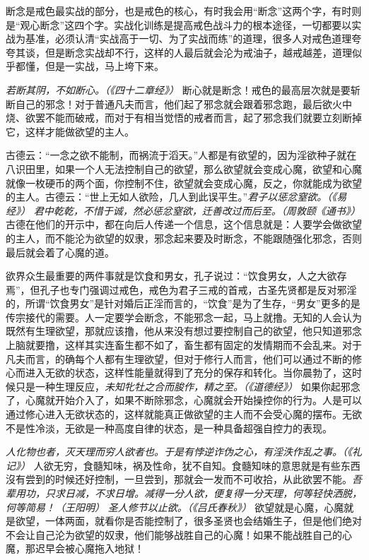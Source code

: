 断念是戒色最实战的部分，也是戒色的核心，有时我会用“断念”这两个字，有时则是“观心断念”这四个字。实战化训练是提高戒色战斗力的根本途径，一切都要以实战为基准，必须认清“实战高于一切、为了实战而练”的道理，很多人对戒色道理夸夸其谈，但是断念实战却不行，这样的人最后就会沦为戒油子，越戒越差，道理似乎都懂，但是一实战，马上垮下来。

\textit{若断其阴，不如断心。（《四十二章经》）} 断心就是断念！戒色的最高层次就是要斩断自己的邪念！对于普通凡夫而言，他们起了邪念就会跟着邪念跑，最后欲火中烧、欲罢不能而破戒，而对于有相当觉悟的戒者而言，起了邪念我们就要立刻断掉它，这样才能做欲望的主人。

古德云：“一念之欲不能制，而祸流于滔天。”人都是有欲望的，因为淫欲种子就在八识田里，如果一个人无法控制自己的欲望，那么欲望就会变成心魔，欲望和心魔就像一枚硬币的两个面，你控制不住，欲望就会变成心魔，反之，你就能成为欲望的主人。古德云：“世上无如人欲险，几人到此误平生。”\textit{君子以惩忿窒欲。（《易经》）} \textit{君中乾乾，不惜于诚，然必惩忿窒欲，迁善改过而后至。（周敦颐《通书》）} 古德在他们的开示中，都在向后人传递一个信息，这个信息就是：人要学会做欲望的主人，而不能沦为欲望的奴隶，邪念起来要及时断念，不能跟随强化邪念，否则最后就会着了心魔的道。

欲界众生最重要的两件事就是饮食和男女，孔子说过：“饮食男女，人之大欲存焉”，但孔子也专门强调过戒色，戒色为君子三戒的首戒，古圣先贤都是反对邪淫的，所谓“饮食男女”是针对婚后正淫而言的，“饮食”是为了生存，“男女”更多的是传宗接代的需要。人一定要学会断念，不能邪念一起，马上就撸。无知的人会认为既然有生理欲望，那就应该撸，他从来没有想过要控制自己的欲望，他只知道邪念上脑就要撸，这样其实连畜生都不如了，畜生都有固定的发情期而不会乱来。对于凡夫而言，的确每个人都有生理欲望，但对于修行人而言，他们可以通过不断的修心而进入无欲的状态，这样性能量就得到了充分的保存和转化。当你晨勃了，这时候只是一种生理反应，\textit{未知牝牡之合而朘作，精之至。（《道德经》）} 如果你起邪念了，心魔就开始介入了，如果不断除邪念，心魔就会开始操控你的行为。人是可以通过修心进入无欲状态的，这样就能真正做欲望的主人而不会受心魔的摆布。无欲不是性冷淡，无欲是一种高度自律的状态，是一种具备超强自控力的表现。

\textit{人化物也者，灭天理而穷人欲者也。于是有悖逆诈伪之心，有淫泆作乱之事。（《礼记》）} 人欲无穷，食髓知味，祸及性命，犹不自知。食髓知味的意思就是有些东西沒有尝到的时候还好控制，一旦尝到，那就会一发而不可收拾，从此欲罢不能。\textit{吾辈用功，只求日减，不求日增。减得一分人欲，便复得一分天理，何等轻快洒脱，何等简易！（王阳明）} \textit{圣人修节以止欲。（《吕氏春秋》）} 欲望就是心魔，心魔就是欲望，一体两面，就看你是否能控制了，很多圣贤也会结婚生子，但是他们绝对不会让自己沦为欲望的奴隶，他们能够战胜自己的心魔！如果不能战胜自己的心魔，那迟早会被心魔拖入地狱！

